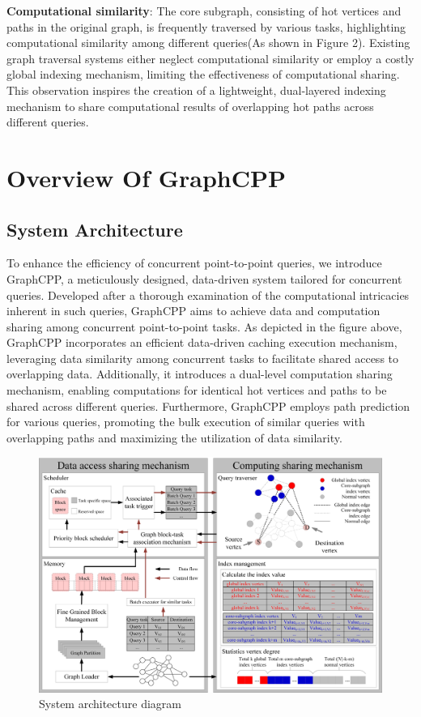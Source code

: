 \documentclass[lettersize,journal]{IEEEtran} %
\begin{document}
{\bf{Computational similarity}}: The core subgraph, consisting of hot vertices and paths in the original graph, is frequently traversed by various tasks, highlighting computational similarity among different queries(As shown in Figure 2). Existing graph traversal systems either neglect computational similarity\cite{pnp} or employ a costly global indexing mechanism\cite{tripoline}\cite{sgraph}, limiting the effectiveness of computational sharing. This observation inspires the creation of a lightweight, dual-layered indexing mechanism to share computational results of overlapping hot paths across different queries. 

\section{Overview Of GraphCPP}

\subsection{System Architecture}
To enhance the efficiency of concurrent point-to-point queries, we introduce GraphCPP, a meticulously designed, data-driven system tailored for concurrent queries. Developed after a thorough examination of the computational intricacies inherent in such queries, GraphCPP aims to achieve data and computation sharing among concurrent point-to-point tasks. As depicted in the figure above, GraphCPP incorporates an efficient data-driven caching execution mechanism, leveraging data similarity among concurrent tasks to facilitate shared access to overlapping data. Additionally, it introduces a dual-level computation sharing mechanism, enabling computations for identical hot vertices and paths to be shared across different queries. Furthermore, GraphCPP employs path prediction for various queries, promoting the bulk execution of similar queries with overlapping paths and maximizing the utilization of data similarity. 

\begin{figure}[!t]
    \centering
    \includegraphics[width=\columnwidth]{系统架构.png}
    \captionsetup{labelsep=period}
    \caption{System architecture diagram}
    \label{fig7}
  \end{figure}
  
\end{document}
